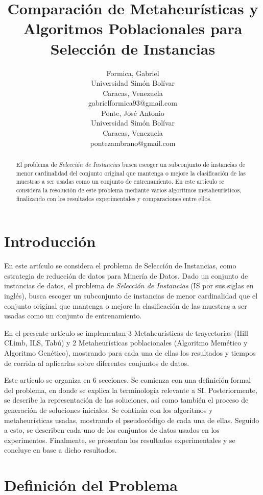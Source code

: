 \documentclass[11pt]{article}
\title{Comparación de Metaheurísticas y Algoritmos Poblacionales
       para Selección de Instancias}
\author{Formica, Gabriel\\
  Universidad Simón Bolívar\\
  Caracas, Venezuela\\
  {gabrielformica93@gmail.com} \\\And
  Ponte, José Antonio\\
  Universidad Simón Bolívar\\
  Caracas, Venezuela\\
  {pontezambrano@gmail.com} \\}
\date{}
\begin{document}
\maketitle
\section{Introducción}
  En este artículo se considera el problema de Selección de Instancias, como
  estrategia de reducción de datos para Minería de Datos. Dado un conjunto de
  instancias de datos, el problema de 
  \textit{Selección de Instancias} (IS por sus siglas en inglés), busca
  escoger un subconjunto de instancias de menor cardinalidad que el conjunto original
  que mantenga o mejore la clasificación de las muestras a ser usadas como un conjunto
  de entrenamiento. 
  
  En el presente artículo se implementan 3 Metaheurísticas de trayectorias 
  (Hill CLimb, ILS, Tabú) y 2 Metaheurísticas poblacionales (Algoritmo Memético y 
  Algoritmo Genético), mostrando para cada una de ellas los resultados 
  y tiempos de corrida al aplicarlas sobre diferentes conjuntos de datos.

  Este artículo se organiza en 6 secciones. Se comienza con una definición
  formal del problema, en donde se explica la terminología relevante a SI. 
  Posteriormente, se describe la representación de las soluciones, así 
  como también el proceso de generación de soluciones iniciales. Se continúa
  con los algoritmos y metaheurísticas usadas, mostrando el pseudocódigo de cada
  una de ellas. Seguido a esto, se describen cada uno de los conjuntos de datos usados
  en los experimentos. Finalmente, se presentan los resultados experimentales y se 
  concluye en base a dicho resultados.

\begin{abstract}
  El problema de \textit{Selección de Instancias}  busca
  escoger un subconjunto de instancias de menor cardinalidad del conjunto original
  que mantenga o mejore la clasificación de las muestras a ser usadas como un conjunto
  de entrenamiento. En este articulo se considera la resolución de este problema
  mediante varios algoritmos metaheurísticos, finalizando con los resultados 
  experimentales y comparaciones entre ellos.
\end{abstract}

\section{Definición del Problema}
\end{document}
